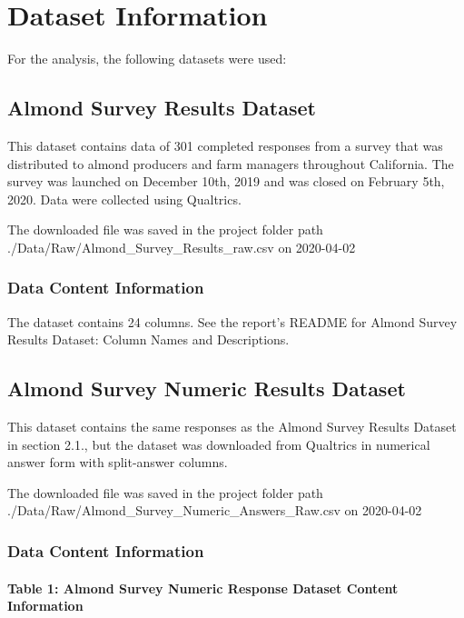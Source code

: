 \documentclass[12pt,]{article}
\let\oldparagraph\paragraph
\renewcommand{\paragraph}[1]{\oldparagraph{#1}\mbox{}}
\begin{document}
\newpage

\section{Dataset Information}\label{dataset-information}

For the analysis, the following datasets were used:

\subsection{Almond Survey Results
Dataset}\label{almond-survey-results-dataset}

This dataset contains data of 301 completed responses from a survey that
was distributed to almond producers and farm managers throughout
California. The survey was launched on December 10th, 2019 and was
closed on February 5th, 2020. Data were collected using Qualtrics.

The downloaded file was saved in the project folder path
./Data/Raw/Almond\_Survey\_Results\_raw.csv on 2020-04-02

\subsubsection{Data Content Information}\label{data-content-information}

The dataset contains 24 columns. See the report's README for Almond
Survey Results Dataset: Column Names and Descriptions.

\subsection{Almond Survey Numeric Results
Dataset}\label{almond-survey-numeric-results-dataset}

This dataset contains the same responses as the Almond Survey Results
Dataset in section 2.1., but the dataset was downloaded from Qualtrics
in numerical answer form with split-answer columns.

The downloaded file was saved in the project folder path
./Data/Raw/Almond\_Survey\_Numeric\_Answers\_Raw.csv on 2020-04-02

\subsubsection{Data Content
Information}\label{data-content-information-1}

\paragraph{Table 1: Almond Survey Numeric Response Dataset Content
Information}\label{table-1-almond-survey-numeric-response-dataset-content-information}
\end{document}
